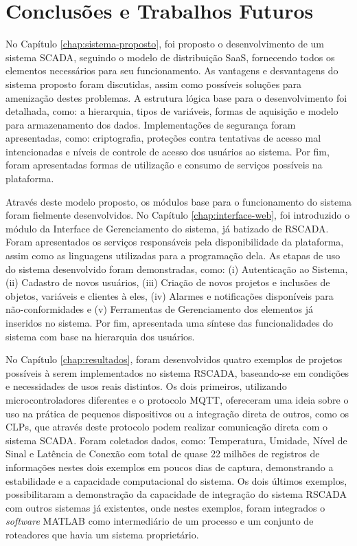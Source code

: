 \chapter{Conclusões e Trabalhos Futuros}
\label{chap:conclusoes-e-trabalhos-futuros}

No Capítulo \ref{chap:sistema-proposto}, foi proposto o desenvolvimento de um sistema \gls{SCADA}, seguindo o modelo de distribuição \gls{SaaS}, fornecendo todos os elementos necessários para seu funcionamento. As vantagens e desvantagens do sistema proposto foram discutidas, assim como possíveis soluções para amenização destes problemas. A estrutura lógica base para o desenvolvimento foi detalhada, como: a hierarquia, tipos de variáveis, formas de aquisição e  modelo para armazenamento dos dados. Implementações de segurança foram apresentadas, como: criptografia, proteções contra tentativas de acesso mal intencionadas e níveis de controle de acesso dos usuários ao sistema. Por fim, foram apresentadas formas de utilização e consumo de serviços possíveis na plataforma.

Através deste modelo proposto, os módulos base para o funcionamento do sistema foram fielmente desenvolvidos. No Capítulo \ref{chap:interface-web}, foi introduzido o módulo da Interface de Gerenciamento do sistema, já batizado de RSCADA. Foram apresentados os serviços responsáveis pela disponibilidade da plataforma, assim como as linguagens utilizadas para a programação dela. As  etapas de uso do sistema desenvolvido foram demonstradas, como: (i) Autenticação ao Sistema, (ii) Cadastro de novos usuários, (iii) Criação de novos projetos e inclusões de objetos, variáveis e clientes à eles, (iv) Alarmes e notificações disponíveis para não-conformidades e (v) Ferramentas de Gerenciamento dos elementos já inseridos no sistema. Por fim, apresentada uma síntese das  funcionalidades do sistema com base na hierarquia dos usuários.

No Capítulo \ref{chap:resultados}, foram desenvolvidos quatro exemplos de projetos possíveis à serem implementados no sistema RSCADA, baseando-se em condições e necessidades de usos reais distintos. Os dois primeiros, utilizando microcontroladores diferentes e o protocolo \gls{MQTT}, ofereceram uma ideia sobre o uso na prática de pequenos dispositivos ou a integração direta de outros, como os \glspl{CLP}, que através deste protocolo podem realizar comunicação direta com o sistema \gls{SCADA}. Foram coletados dados, como: Temperatura, Umidade, Nível de Sinal e Latência de Conexão com total de quase 22 milhões de registros de informações nestes dois exemplos em poucos dias de captura, demonstrando a estabilidade e a capacidade computacional do sistema. Os dois últimos exemplos, possibilitaram a demonstração da capacidade de integração do sistema RSCADA com outros sistemas já existentes, onde nestes exemplos, foram integrados o \textit{software} MATLAB como intermediário de um processo e um conjunto de roteadores que havia um sistema proprietário.

